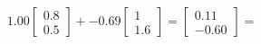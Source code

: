 \documentclass[preview]{standalone}
\begin{document}
\begin{align*}
1.00 \begin{bmatrix} 0.8 \\ 0.5 \end{bmatrix} + -0.69 \begin{bmatrix} 1 \\ 1.6 \end{bmatrix} = \begin{bmatrix} 0.11 \\ -0.60 \end{bmatrix} =
\end{align*}
\end{document}

